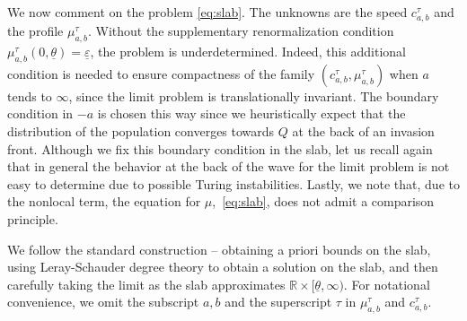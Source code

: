 \documentclass[11pt]{article}    %
\newcommand{\R}{\mathbb{R}}
\renewcommand{\epsilon}{\varepsilon}
\newcommand{\eps}{\varepsilon}
\begin{document}
We now comment on the problem \eqref{eq:slab}. The unknowns are the speed $c_{a,b}^\tau$ and the profile $\mu_{a,b}^\tau$. Without the supplementary renormalization condition $\mu_{a,b}^\tau(0,\underline\theta) = \underline\epsilon$, the problem is underdetermined. Indeed, this additional condition is needed to ensure compactness of the family $(c_{a,b}^\tau,\mu_{a,b}^\tau)$ when $a$ tends to $\infty$, since the limit problem is translationally invariant. The boundary condition in $-a$ is chosen this way since we heuristically expect that the distribution of the population converges towards $Q$ at the back of an invasion front.  Although we fix this boundary condition in the slab, let us recall again that in general the behavior at the back of the wave for the limit problem is not easy to determine due to possible Turing instabilities.   Lastly, we note that, due to the nonlocal term, the equation for $\mu$,~\eqref{eq:slab}, does not admit a comparison principle.



We follow the standard construction -- obtaining a priori bounds on the slab, using Leray-Schauder degree theory to obtain a solution on the slab, and then carefully taking the limit as the slab approximates $\R\times [\underline\theta,\infty)$.
For notational convenience, we  omit the subscript $a,b$ and the superscript $\tau$ in $\mu_{a,b}^\tau$ and $c_{a,b}^\tau$.
\end{document}
